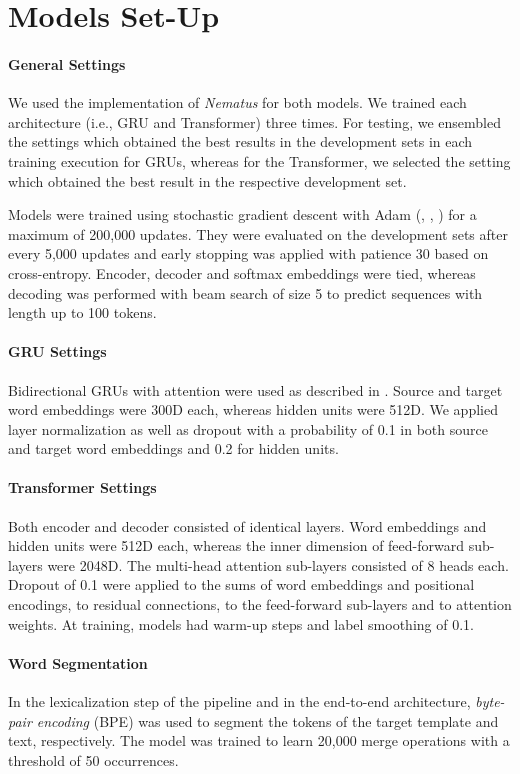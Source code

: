 \documentclass[11pt,a4paper]{article}
\begin{document}
\section{Models Set-Up}

\paragraph{General Settings} We used the implementation of \textit{Nematus} \cite{sennrich2017} for both models. We trained each architecture (i.e., GRU and Transformer) three times. For testing, we ensembled the settings which obtained the best results in the development sets in each training execution for GRUs, whereas for the Transformer, we selected the setting which obtained the best result in the respective development set.

Models were trained using stochastic gradient descent with Adam \cite{diederik2015} (, , ) for a maximum of 200,000 updates. They were evaluated on the development sets after every 5,000 updates and early stopping was applied with patience 30 based on cross-entropy. Encoder, decoder and softmax embeddings were tied, whereas decoding was performed with beam search of size 5 to predict sequences with length up to 100 tokens. 

\paragraph{GRU Settings} Bidirectional GRUs with attention were used as described in \citet{sennrich2017}. Source and target word embeddings were 300D each, whereas hidden units were 512D.  We applied layer normalization as well as dropout with a probability of 0.1 in both source and target word embeddings and 0.2 for hidden units.

\paragraph{Transformer Settings} Both encoder and decoder consisted of  identical layers. Word embeddings and hidden units were 512D each, whereas the inner dimension of feed-forward sub-layers were 2048D. The multi-head attention sub-layers consisted of 8 heads each. Dropout of 0.1 were applied to the sums of word embeddings and positional encodings, to residual connections, to the feed-forward sub-layers and to attention weights. At training, models had  warm-up steps and label smoothing of 0.1.   

\paragraph{Word Segmentation} In the lexicalization step of the pipeline and in the end-to-end architecture, \textit{byte-pair encoding} (BPE) \cite{sennrich2016b} was used to segment the tokens of the target template and text, respectively. The model was trained to learn 20,000 merge operations with a threshold of 50 occurrences.
\end{document}
